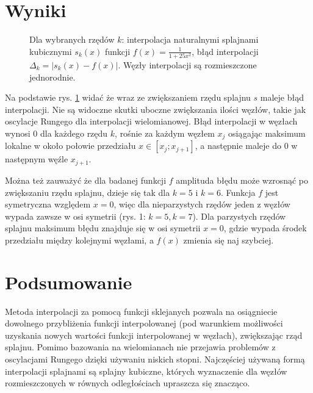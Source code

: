 \documentclass[11pt]{extarticle}
\begin{document}
	\section{Wyniki}
	\begin{figure}[H]
		\begin{center}
			
		\end{center}
		\caption{
			Dla wybranych rzędów \(k\): interpolacja naturalnymi splajnami kubicznymi \(s_k(x)\) funkcji \( f(x)=\frac{1}{1+25x^2} \), błąd interpolacji \(\Delta_k = |s_k(x) - f(x)|\).
			Węzły interpolacji są rozmieszczone jednorodnie.
		}
		\label{ch}
	\end{figure}
	Na podstawie rys. \ref{ch} widać że wraz ze zwiększaniem rzędu splajnu \(s\) maleje błąd interpolacji.
	Nie są widoczne skutki uboczne zwiększania ilości węzłów, takie jak oscylacje Rungego dla interpolacji wielomianowej.
	Błąd interpolacji w węzłach wynosi \(0\) dla każdego rzędu \(k\), rośnie za każdym węzłem \(x_j\) osiągając maksimum lokalne w około połowie przedziału \(x \in [x_j; x_{j+1}] \), a następnie maleje do \(0\) w następnym węźle \(x_{j+1}\).
	
	Można też zauważyć że dla badanej funkcji \(f\) amplituda błędu może wzrosnąć po zwiększaniu rzędu splajnu, dzieje się tak dla \(k=5\) i \(k=6\).
	Funkcja \(f\) jest symetryczna względem \(x=0\), więc dla nieparzystych rzędów jeden z węzłów wypada zawsze w osi symetrii (rys. 1: \(k=5, k=7\)).
	Dla parzystych rzędów splajnu maksimum błędu znajduje się w osi symetrii \(x=0\), gdzie wypada środek przedziału między kolejnymi węzłami, a \(f(x)\) zmienia się naj szybciej.

	\section{Podsumowanie}

	Metoda interpolacji za pomocą funkcji sklejanych pozwala na osiągniecie dowolnego przybliżenia funkcji interpolowanej (pod warunkiem możliwości uzyskania nowych wartości funkcji interpolowanej w węzłach), zwiększając rząd splajnu.
	Pomimo bazowania na wielomianach nie przejawia problemów z oscylacjami Rungego dzięki używaniu niskich stopni.
	Najczęściej używaną formą interpolacji splajnami są splajny kubiczne, których wyznaczenie dla węzłów rozmieszczonych w równych odległościach upraszcza się znacząco.
	
\end{document}
